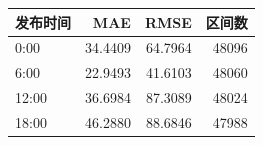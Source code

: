 \begin{tabular}{lrrr}
\toprule
发布时间 & MAE & RMSE & 区间数 \\
\midrule
0:00 & 34.4409 & 64.7964 & 48096 \\
6:00 & 22.9493 & 41.6103 & 48060 \\
12:00 & 36.6984 & 87.3089 & 48024 \\
18:00 & 46.2880 & 88.6846 & 47988 \\
\bottomrule
\end{tabular}
